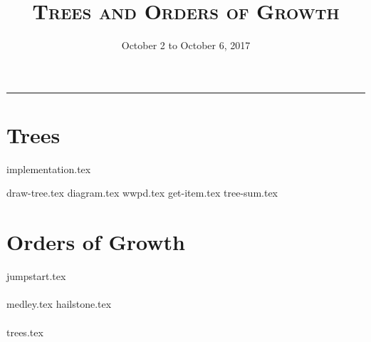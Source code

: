 \documentclass{exam}
\title{\textsc{Trees and Orders of Growth}}
\date{October 2 to October 6, 2017}
\begin{document}
\maketitle
\rule{\textwidth}{0.15em}
\fontsize{12}{15}\selectfont



\section{Trees}
{implementation.tex}
\begin{questions}
{draw-tree.tex}
{diagram.tex}
{wwpd.tex}
{get-item.tex}
{tree-sum.tex}

\section{Orders of Growth}
{jumpstart.tex}
\\\\
{medley.tex}
{hailstone.tex}
\\\\
{trees.tex}



\end{questions}
\end{document}
